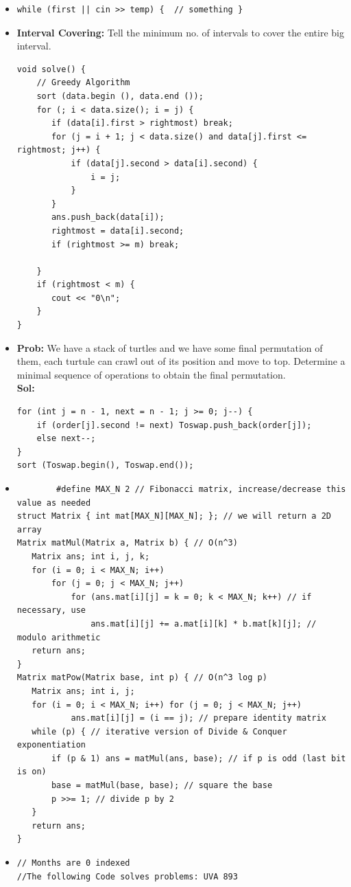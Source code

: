 \documentclass[8pt, a4paper, oneside, twocolumn]{extarticle}
\begin{document}
\begin{itemize}
\begin{verbatim}
    \end{verbatim}
    \item \begin{verbatim}
while (first || cin >> temp) {  // something }
            \end{verbatim}
    \item \textbf{Interval Covering: }Tell the minimum no. of intervals to cover the entire big interval.
    \begin{verbatim}
void solve() {
    // Greedy Algorithm
    sort (data.begin (), data.end ()); 
    for (; i < data.size(); i = j) {
       if (data[i].first > rightmost) break;
       for (j = i + 1; j < data.size() and data[j].first <= rightmost; j++) {
           if (data[j].second > data[i].second) {
               i = j;
           }
       }
       ans.push_back(data[i]);
       rightmost = data[i].second;
       if (rightmost >= m) break;

    }
    if (rightmost < m) {
       cout << "0\n";
    }
}

    \end{verbatim}
    \item \textbf{Prob: }We have a stack of turtles and we have some final permutation of them, each turtule can crawl out of its position and move to top. Determine a minimal sequence of operations to obtain the final permutation.\\\textbf{Sol: }
    \begin{verbatim}
for (int j = n - 1, next = n - 1; j >= 0; j--) {
    if (order[j].second != next) Toswap.push_back(order[j]);
    else next--;
}
sort (Toswap.begin(), Toswap.end());
\end{verbatim}
    \item \begin{verbatim}
        #define MAX_N 2 // Fibonacci matrix, increase/decrease this value as needed
struct Matrix { int mat[MAX_N][MAX_N]; }; // we will return a 2D array
Matrix matMul(Matrix a, Matrix b) { // O(n^3)
   Matrix ans; int i, j, k;
   for (i = 0; i < MAX_N; i++)
       for (j = 0; j < MAX_N; j++)
           for (ans.mat[i][j] = k = 0; k < MAX_N; k++) // if necessary, use
               ans.mat[i][j] += a.mat[i][k] * b.mat[k][j]; // modulo arithmetic
   return ans;
}
Matrix matPow(Matrix base, int p) { // O(n^3 log p)
   Matrix ans; int i, j;
   for (i = 0; i < MAX_N; i++) for (j = 0; j < MAX_N; j++)
           ans.mat[i][j] = (i == j); // prepare identity matrix
   while (p) { // iterative version of Divide & Conquer exponentiation
       if (p & 1) ans = matMul(ans, base); // if p is odd (last bit is on)
       base = matMul(base, base); // square the base
       p >>= 1; // divide p by 2
   }
   return ans;
}
    \end{verbatim}
    \item \begin{verbatim}
// Months are 0 indexed
//The following Code solves problems: UVA 893 


\end{verbatim}
\end{itemize}
\end{document}
